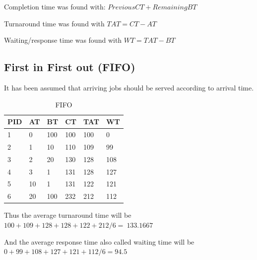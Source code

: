 \documentclass[11pt,a4paper]{article}
\theoremstyle{plain}
\theoremstyle{definition}
\theoremstyle{remark}
\numberwithin{equation}{section}
\begin{document}
Completion time was found with: $PreviousCT+RemainingBT$

Turnaround time was found with $TAT = CT-AT$

Waiting/response time was found with $WT = TAT-BT$


\subsection*{First in First out (FIFO)} %

It has been assumed that arriving jobs should be served according to arrival time.

\begin{table}[H]
	\centering
	\caption{FIFO}
	\label{t2-fifo}
	\begin{tabular}{llllll}
		\hline
		\multicolumn{1}{|l|}{PID} & \multicolumn{1}{l|}{AT} & \multicolumn{1}{l|}{BT} & \multicolumn{1}{l|}{CT} & \multicolumn{1}{l|}{TAT} & \multicolumn{1}{l|}{WT} \\ \hline
		1                         & 0                       & 100                     & 100                     & 100                      & 0                       \\
		2                         & 1                       & 10                      & 110                     & 109                      & 99                      \\
		3                         & 2                       & 20                      & 130                     & 128                      & 108                     \\
		4                         & 3                       & 1                       & 131                     & 128                      & 127                     \\
		5                         & 10                      & 1                       & 131                     & 122                      & 121                     \\
		6                         & 20                      & 100                     & 232                     & 212                      & 112                    
	\end{tabular}
\end{table}

Thus the average turnaround time will be $100+109+128+128+122+212/6=~133.1667$

And the average response time also called waiting time will be $0+99+108+127+121+112/6=94.5$
\end{document}
